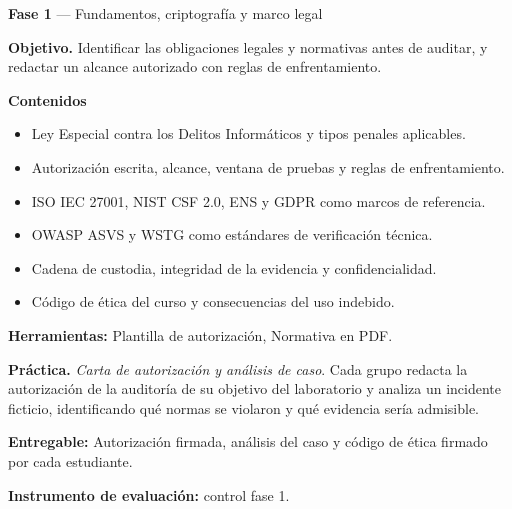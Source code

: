 \documentclass[11pt,a4paper]{article}
\begin{document}
\begin{tcolorbox}[cajaContenido,title={Semana 3 --- Marco legal, ético y normativo}]
\textbf{Fase 1} --- Fundamentos, criptografía y marco legal

\textbf{Objetivo.} Identificar las obligaciones legales y normativas antes de auditar, y redactar un alcance autorizado con reglas de enfrentamiento.

\textbf{Contenidos}

\begin{itemize}[leftmargin=1.4em,itemsep=2pt,topsep=3pt]
  \item Ley Especial contra los Delitos Informáticos y tipos penales aplicables.
  \item Autorización escrita, alcance, ventana de pruebas y reglas de enfrentamiento.
  \item ISO IEC 27001, NIST CSF 2.0, ENS y GDPR como marcos de referencia.
  \item OWASP ASVS y WSTG como estándares de verificación técnica.
  \item Cadena de custodia, integridad de la evidencia y confidencialidad.
  \item Código de ética del curso y consecuencias del uso indebido.
\end{itemize}

\textbf{Herramientas:} Plantilla de autorización, Normativa en PDF.

\textbf{Práctica.} \emph{Carta de autorización y análisis de caso}. Cada grupo redacta la autorización de la auditoría de su objetivo del laboratorio y analiza un incidente ficticio, identificando qué normas se violaron y qué evidencia sería admisible.


\textbf{Entregable:} Autorización firmada, análisis del caso y código de ética firmado por cada estudiante.

\textbf{Instrumento de evaluación:} control fase 1.
\end{tcolorbox}
\end{document}
